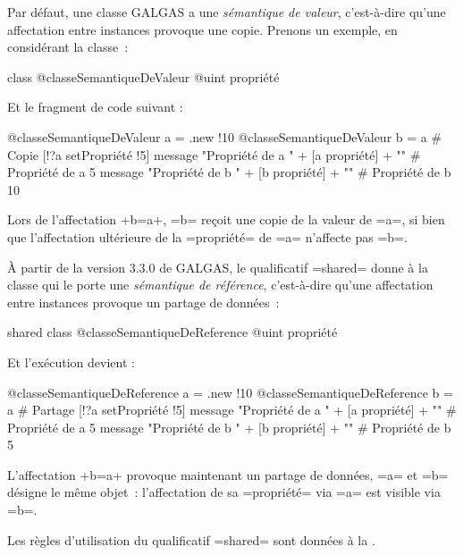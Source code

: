 
Par défaut, une classe GALGAS a une \emph{sémantique de valeur}, c'est-à-dire qu'une affectation entre instances provoque une copie. Prenons un exemple, en considérant la classe~:

\begin{galgas}
class @classeSemantiqueDeValeur {
  @uint propriété %
}
\end{galgas}

Et le fragment de code suivant :

\begin{galgas}
@classeSemantiqueDeValeur a = .new {!10}
@classeSemantiqueDeValeur b = a # Copie
[!?a setPropriété !5]
message "Propriété de a " + [a propriété] + "\n" # Propriété de a 5
message "Propriété de b " + [b propriété] + "\n" # Propriété de b 10
\end{galgas}

Lors de l'affectation \ggs+b=a+, \ggs=b= reçoit une copie de la valeur de \ggs=a=, si bien que l'affectation ultérieure de la \ggs=propriété= de \ggs=a= n'affecte pas \ggs=b=.

 À partir de la version 3.3.0 de GALGAS, le qualificatif \ggs=shared= donne à la classe qui le porte une \emph{sémantique de référence}, c'est-à-dire qu'une affectation entre instances provoque un partage de données~:

\begin{galgas}
shared class @classeSemantiqueDeReference {
  @uint propriété %
}
\end{galgas}

Et l'exécution devient :

\begin{galgas}
@classeSemantiqueDeReference a = .new {!10}
@classeSemantiqueDeReference b = a # Partage
[!?a setPropriété !5]
message "Propriété de a " + [a propriété] + "\n" # Propriété de a 5
message "Propriété de b " + [b propriété] + "\n" # Propriété de b 5
\end{galgas}

L'affectation \ggs+b=a+ provoque maintenant un partage de données, \ggs=a= et \ggs=b= désigne le même objet~: l'affectation de sa \ggs=propriété= via \ggs=a= est visible via \ggs=b=.

Les règles d'utilisation du qualificatif \ggs=shared= sont données à la .








